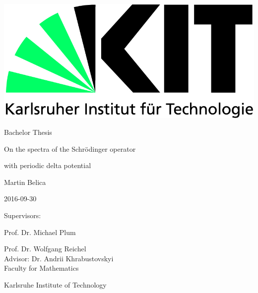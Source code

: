 \begin{titlepage}
  \includegraphics[scale=0.45]{kit-logo.jpg}
  \vspace*{1cm} 

  \begin{center} \large 
    
    Bachelor Thesis
    \vspace*{1.5cm}

    {\huge On the spectra of the Schrödinger operator}
     \vspace{-0.45cm}
     
    {\huge with periodic delta potential}
    \vspace*{2cm}

    Martin Belica
    \vspace{-0.5cm}

    2016-09-30
    \vspace*{3.5cm}


    Supervisors: 
    \vspace{-0.35cm}
    
    Prof. Dr. Michael Plum
    \vspace{-0.5cm}
    
    Prof. Dr. Wolfgang Reichel \\[1cm]
    Advisor: Dr. Andrii Khrabustovskyi \\[1cm]
    Faculty for Mathematics
    \vspace{-0.5cm}

	Karlsruhe Institute of Technology
  \end{center}
\end{titlepage}